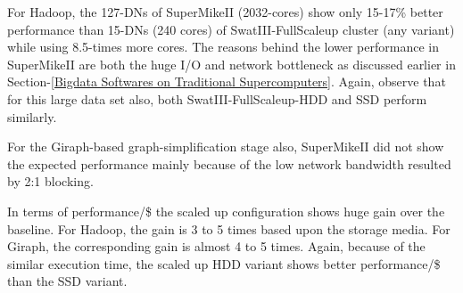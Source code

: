 \documentclass[10pt, conference, compsocconf]{IEEEtran}
\begin{document}
\begin{inparaenum}[\itshape 1\upshape)]
\item For Hadoop, the 127-DNs of SuperMikeII (2032-cores) show only 15-17\% better performance than 15-DNs (240 cores) of SwatIII-FullScaleup cluster (any variant) while using 8.5-times more cores. The reasons behind the lower performance in SuperMikeII are both the huge I/O and network bottleneck as discussed earlier in Section-\ref{Bigdata Softwares on Traditional Supercomputers}. Again, observe that for this large data set also, both SwatIII-FullScaleup-HDD and SSD perform similarly.
\item For the Giraph-based graph-simplification stage also, SuperMikeII did not show the expected performance mainly because of the low network bandwidth resulted by 2:1 blocking.  
\item In terms of performance/\$ the scaled up configuration shows huge gain over the baseline. For Hadoop, the gain is 3 to 5 times based upon the storage media. For Giraph, the corresponding gain is almost 4 to 5 times. Again, because of the similar execution time, the scaled up HDD variant shows better performance/\$ than the SSD variant.
\end{inparaenum}
\end{document}
